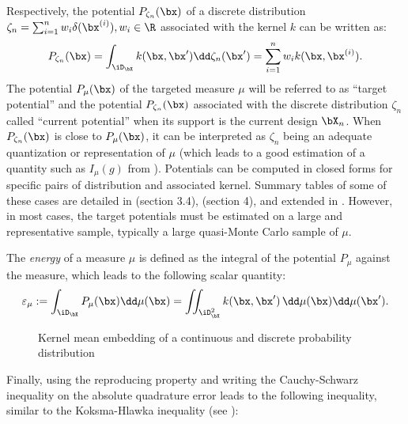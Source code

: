 Respectively, the potential $P_{\zeta_n}(\bx)$ of a discrete distribution $\zeta_n = \sum_{i=1}^{n} w_i \delta(\bx^{(i)}), w_i \in \R$ associated with the kernel $k$ can be written as:
\begin{equation}\label{eq:potential}
    P_{\zeta_n}(\bx) =  \int_{\iD_{\bX}} k(\bx, \bx') \dd \zeta_n(\bx') = \sum_{i=1}^{n} w_i k(\bx, \bx^{(i)}).
\end{equation}
The potential $P_{\mu}(\bx)$ of the targeted measure $\mu$ will be referred to as ``target potential'' and the potential $P_{\zeta_n}(\bx)$ associated with the discrete distribution $\zeta_n$ called ``current potential'' when its support is the current design $\bX_n$. 
When $P_{\zeta_n}(\bx)$ is close to $P_{\mu}(\bx)$, it can be interpreted as $\zeta_n$ being an adequate quantization or representation of $\mu$ (which leads to a good estimation of a quantity such as $I_{\mu}(g)$ from ). 
Potentials can be computed in closed forms for specific pairs of distribution and associated kernel. Summary tables of some of these cases are detailed in \cite{briol_phd_2019} (section 3.4), \cite{pronzato_zhigljavsky_2020} (section 4), and extended in \cite{fekhari_iooss_2023}. 
However, in most cases, the target potentials must be estimated on a large and representative sample, typically a large quasi-Monte Carlo sample of $\mu$.

\medskip
\begin{definition}
The \emph{energy} of a measure $\mu$ is defined as the integral of the potential $P_\mu$ against the measure, which leads to the following scalar quantity:
\begin{equation}
    \varepsilon_\mu:= \int_{\iD_{\bX}} P_{\mu}(\bx) \dd \mu(\bx) = \iint_{\iD_{\bX}^2} k(\bx, \bx')\, \dd\mu(\bx) \dd\mu(\bx').
\end{equation}
\label{eq:target_energy}
\end{definition}

\begin{figure}[!h]
    \centering
    
    \caption{Kernel mean embedding of a continuous and discrete probability distribution}
    \label{fig:kernel_mean_embedding}
\end{figure}
Finally, using the reproducing property and writing the Cauchy-Schwarz inequality on the absolute quadrature error leads to the following inequality, similar to the Koksma-Hlawka inequality  (see \cite{briol_oates_2019}): 

